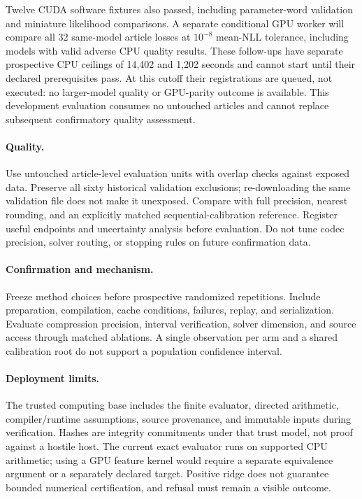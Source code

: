 \documentclass[10pt,twocolumn,letterpaper]{article}
\begin{document}
Twelve CUDA software fixtures also passed, including parameter-word validation
and miniature likelihood comparisons. A separate conditional GPU worker will
compare all 32 same-model article losses at $10^{-8}$ mean-NLL tolerance,
including models with valid adverse CPU quality results. These follow-ups have
separate prospective CPU ceilings of 14,402 and 1,202 seconds and cannot start
until their declared prerequisites pass. At this cutoff their registrations
are queued, not executed: no larger-model quality or GPU-parity outcome is
available. This development evaluation consumes no untouched articles and
cannot replace subsequent confirmatory quality assessment.

\paragraph{Quality.}
Use untouched article-level evaluation units with overlap checks against exposed
data. Preserve all sixty historical validation exclusions; re-downloading the
same validation file does not make it unexposed. Compare with full precision,
nearest rounding, and an explicitly matched sequential-calibration reference.
Register useful endpoints and uncertainty analysis before evaluation. Do not tune
codec precision, solver routing, or stopping rules on future confirmation data.

\paragraph{Confirmation and mechanism.}
Freeze method choices before prospective randomized repetitions. Include
preparation, compilation, cache conditions, failures, replay, and serialization.
Evaluate compression precision, interval verification, solver dimension, and
source access through matched ablations. A single observation per arm and a
shared calibration root do not support a population confidence interval.

\paragraph{Deployment limits.}
The trusted computing base includes the finite evaluator, directed arithmetic,
compiler/runtime assumptions, source provenance, and immutable inputs during
verification. Hashes are integrity commitments under that trust model, not proof
against a hostile host. The current exact evaluator runs on supported CPU
arithmetic; using a GPU feature kernel would require a separate equivalence
argument or a separately declared target. Positive ridge does not guarantee
bounded numerical certification, and refusal must remain a visible outcome.
\end{document}
